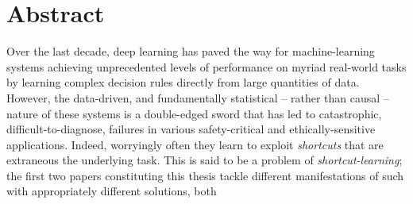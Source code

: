 \begingroup
\let\clearpage\relax
\let\cleardoublepage\relax
\let\cleardoublepage\relax

\chapter*{Abstract}
%
%
Over the last decade, deep learning has paved the way for machine-learning systems achieving
unprecedented levels of performance on myriad real-world tasks by learning complex decision rules
directly from large quantities of data.
%
However, the data-driven, and fundamentally statistical -- rather than causal -- nature of these
systems is a double-edged sword that has led to catastrophic, difficult-to-diagnose, failures in
various safety-critical and ethically-sensitive applications.
%
%
Indeed, worryingly often they learn to exploit \emph{shortcuts} that are extraneous \wrt{} the
underlying task.
%
%
This is said to be a problem of \emph{shortcut-learning}; the first two papers constituting this
thesis tackle different manifestations of such with appropriately different solutions, both
